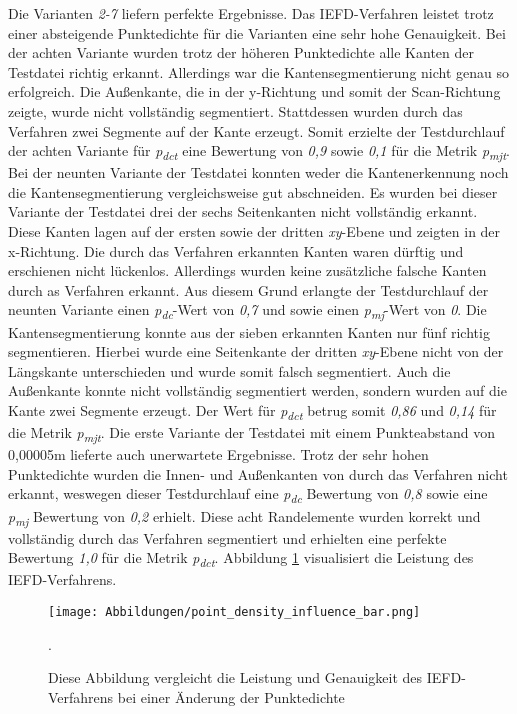 Die Varianten \textit{2-7} liefern perfekte Ergebnisse. Das IEFD-Verfahren leistet trotz einer absteigende Punktedichte für die Varianten eine sehr hohe Genauigkeit. Bei der achten Variante wurden trotz der höheren Punktedichte alle Kanten der Testdatei richtig erkannt. Allerdings war die Kantensegmentierung nicht genau so erfolgreich. Die Außenkante, die in der y-Richtung und somit der Scan-Richtung zeigte, wurde nicht vollständig segmentiert. Stattdessen wurden durch das Verfahren zwei Segmente auf der Kante erzeugt. Somit erzielte der Testdurchlauf der achten Variante für \textit{p\textsubscript{dct}} eine Bewertung von \textit{0,9} sowie \textit{0,1} für die Metrik \textit{p\textsubscript{mjt}}. Bei der neunten Variante der Testdatei konnten weder die Kantenerkennung noch die Kantensegmentierung vergleichsweise gut abschneiden. Es wurden bei dieser Variante der Testdatei drei der sechs Seitenkanten nicht vollständig erkannt. Diese Kanten lagen auf der ersten sowie der dritten \textit{xy}-Ebene und zeigten in der x-Richtung. Die durch das Verfahren erkannten Kanten waren dürftig und erschienen nicht lückenlos. Allerdings wurden keine zusätzliche falsche Kanten durch as Verfahren erkannt. Aus diesem Grund erlangte der Testdurchlauf der neunten Variante einen \textit{p\textsubscript{dc}}-Wert von \textit{0,7} und sowie einen \textit{p\textsubscript{mj}}-Wert von \textit{0}. Die Kantensegmentierung konnte aus der sieben erkannten Kanten nur fünf richtig segmentieren. Hierbei wurde eine Seitenkante der dritten \textit{xy}-Ebene nicht von der Längskante unterschieden und wurde somit falsch segmentiert. Auch die Außenkante konnte nicht vollständig segmentiert werden, sondern wurden auf die Kante zwei Segmente erzeugt. Der Wert für \textit{p\textsubscript{dct}} betrug somit \textit{0,86} und \textit{0,14} für die Metrik \textit{p\textsubscript{mjt}}. Die erste Variante der Testdatei mit einem Punkteabstand von 0,00005m lieferte auch unerwartete Ergebnisse. Trotz der sehr hohen Punktedichte wurden die Innen- und Außenkanten von \testcloud durch das Verfahren nicht erkannt, weswegen dieser Testdurchlauf eine \textit{p\textsubscript{dc}} Bewertung von \textit{0,8} sowie eine \textit{p\textsubscript{mj}} Bewertung von \textit{0,2} erhielt. Diese acht Randelemente wurden korrekt und vollständig durch das Verfahren segmentiert und erhielten eine perfekte Bewertung \textit{1,0} für die Metrik \textit{p\textsubscript{dct}}. Abbildung \ref{fig: point_density_bar_chart} visualisiert die Leistung des IEFD-Verfahrens.

\begin{figure}[t]
	\texttt{[image: Abbildungen/point\_density\_influence\_bar.png]}
	\centering
	\caption{Diese Abbildung vergleicht die Leistung und Genauigkeit des IEFD-Verfahrens bei einer Änderung der Punktedichte}.
	\label{fig: point_density_bar_chart}
\end{figure}

